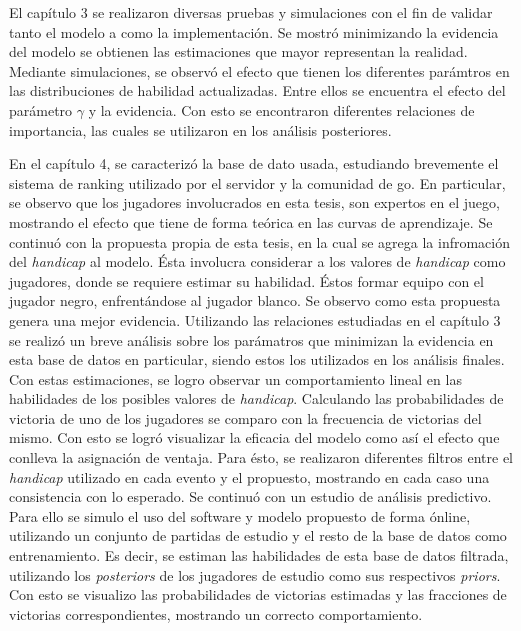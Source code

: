 \documentclass[11pt,twoside, spanish]{report} %
\begin{document}
El cap\'itulo 3 se realizaron diversas pruebas y simulaciones con el fin de validar tanto el modelo a como la implementaci\'on.
Se mostr\'o minimizando la evidencia del modelo se obtienen las estimaciones que mayor representan la realidad.
Mediante simulaciones, se observ\'o el efecto que tienen los diferentes par\'amtros en las distribuciones de habilidad actualizadas.
Entre ellos se encuentra el efecto del par\'ametro $\gamma$ y la evidencia.
Con esto se encontraron diferentes relaciones de importancia, las cuales se utilizaron en los an\'alisis posteriores.

En el cap\'itulo 4, se caracteriz\'o la base de dato usada,   estudiando brevemente el sistema de ranking utilizado por el servidor y la comunidad de go.
En particular, se observo que los jugadores involucrados en esta tesis, son expertos en el juego, mostrando el efecto que tiene de forma te\'orica en las curvas de aprendizaje.
Se continu\'o con la propuesta propia de esta tesis, en la cual se agrega la infromaci\'on del \textit{handicap} al modelo.
\'Esta involucra considerar a los valores de \textit{handicap} como jugadores, donde se requiere estimar su habilidad.
\'Estos formar equipo con el jugador negro, enfrent\'andose al jugador blanco.
Se observo como esta propuesta genera una mejor evidencia.
Utilizando las relaciones estudiadas en el cap\'itulo 3 se realiz\'o un breve an\'alisis sobre los par\'amatros que minimizan la evidencia en esta base de datos en particular, siendo estos los utilizados en los an\'alisis finales.
Con estas estimaciones, se logro observar un comportamiento lineal en las habilidades de los posibles valores de \textit{handicap}.
Calculando las probabilidades de victoria de uno de los jugadores se comparo con la frecuencia de victorias del mismo.
Con esto se logr\'o visualizar la eficacia del modelo como as\'i el efecto que conlleva la asignaci\'on de ventaja.
Para \'esto, se realizaron diferentes filtros entre el \textit{handicap} utilizado en cada evento y el propuesto, mostrando en cada caso una consistencia con lo esperado.
Se continu\'o con un estudio de an\'alisis predictivo.
Para ello se simulo el uso del software y modelo propuesto de forma \'online, utilizando un conjunto de partidas de estudio y el resto de la base de datos como entrenamiento.
Es decir, se estiman las habilidades de esta base de datos filtrada, utilizando los \textit{posteriors} de los jugadores de estudio como sus respectivos \textit{priors}.
Con esto se visualizo las probabilidades de victorias estimadas y las fracciones de victorias correspondientes, mostrando un correcto comportamiento.
\end{document}
